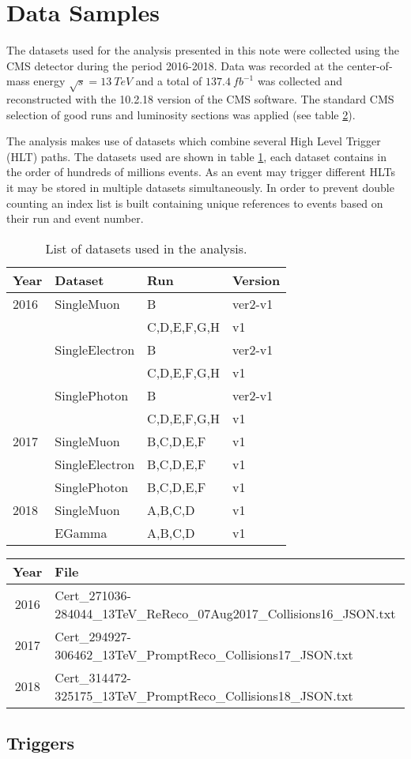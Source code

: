 \section{Data Samples}

The datasets used for the analysis presented in this note were collected using
the CMS detector during the period 2016-2018. Data was recorded at the
center-of-mass energy $\sqrt{s}=13~TeV$ and a total of $137.4~fb^{-1}$ was collected
and reconstructed with the 10.2.18 version of the CMS software. The standard
CMS selection of good runs and luminosity sections was applied
(see table \ref{tab:GoldenJson}).

The analysis makes use of datasets which combine several High Level Trigger
(HLT) paths. The datasets used are shown in table \ref{tab:Datasets}, each
dataset contains in the order of hundreds of millions events. As an event
may trigger different HLTs it may be stored in multiple datasets simultaneously.
In order to prevent double counting an index list is built containing unique
references to events based on their run and event number.

\begin{table}[h]
\centering
\caption{List of datasets used in the analysis.}
\begin{tabular}{|l|l|l|l|}
\hline
Year & Dataset & Run & Version \\ \hline
2016 & SingleMuon     & B           & ver2-v1 \\
     &                & C,D,E,F,G,H & v1      \\
     & SingleElectron & B           & ver2-v1 \\
     &                & C,D,E,F,G,H & v1      \\
     & SinglePhoton   & B           & ver2-v1 \\
     &                & C,D,E,F,G,H & v1      \\ \hline
2017 & SingleMuon     & B,C,D,E,F & v1 \\
     & SingleElectron & B,C,D,E,F & v1 \\
     & SinglePhoton   & B,C,D,E,F & v1 \\\hline
2018 & SingleMuon & A,B,C,D & v1 \\
     & EGamma     & A,B,C,D & v1 \\ \hline
\end{tabular}
\label{tab:Datasets}
\end{table}


\begin{table}[htbp]
  \footnotesize
  \centering
  \label{tab:gJSON}
  \begin{tabular}{ c l }
    \hline
    Year & File \\
    \hline
    2016 & Cert\_271036-284044\_13TeV\_ReReco\_07Aug2017\_Collisions16\_JSON.txt \\
    2017 & Cert\_294927-306462\_13TeV\_PromptReco\_Collisions17\_JSON.txt \\
    2018 & Cert\_314472-325175\_13TeV\_PromptReco\_Collisions18\_JSON.txt \\
    \hline
  \end{tabular}
  \label{tab:GoldenJson}
\end{table}

\subsection{Triggers}

